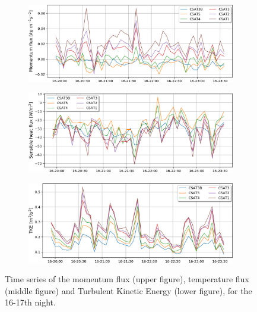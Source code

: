 \begin{figure}[!ht]
    \centering
    \begin{subfigure}[b]{0.6\textwidth}
        \includegraphics[width=\textwidth]{fig/chapter_4/16-17/Tau_16-17.png}
      \label{fig:Tau_16-17}
    \end{subfigure}
    \begin{subfigure}[b]{0.6\textwidth}
        \includegraphics[width=\textwidth]{fig/chapter_4/16-17/H_16-17.png}
        \label{fig:H_16-17}
    \end{subfigure}
    \begin{subfigure}[b]{0.6\textwidth}
        \includegraphics[width=\textwidth]{fig/chapter_4/16-17/TKE_16-17.png}
        \label{fig:TKE_16-17}
    \end{subfigure}
    \caption{Time series of the momentum flux (upper figure), temperature flux (middle figure) and Turbulent Kinetic Energy (lower figure), for the 16-17th night.}
    \label{fig:16-17_flux_series}
\end{figure}

